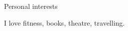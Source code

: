 \begin{rubric}{Personal interests}

\entry*[]
I love fitness, books, theatre, travelling.


\end{rubric}
